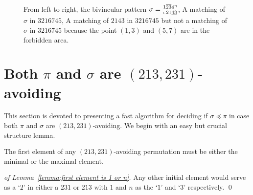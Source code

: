 \documentclass[a4paper]{llncs}
\newcommand\BV[2]{\genfrac{}{}{0pt}{}{#1}{#2}}
\begin{document}
\begin{figure}[t]
    	 
    	 
    	    	
    	\caption[Example pattern matching]{
    		From left to right,
    		the bivincular pattern $\sigma = \BV{1\overline{23}4\urcorner}{\llcorner 21\underline{43}  }$, A matching of $\sigma$ in $3216745$, A matching of $2143$ in $3216745$ but not a matching of $\sigma$ in $3216745$ because the point $(1,3)$ and $(5,7)$ are in the forbidden area.} 
    	\label{example:bivincular pattern matching}
\end{figure}


\section{Both $\pi$ and $\sigma$ are $(213,231)$-avoiding}
\label{section:both are (213,231)-avoiding}



This section is devoted to presenting a fast algorithm for deciding if
$\sigma \preceq \pi$
in case both $\pi$ and $\sigma$ are $(213,231)$-avoiding.
We begin with an easy but crucial structure lemma.

\begin{lemma}[Folklore]
\label{lemma:first element is 1 or n}
The first element of any $(213,231)$-avoiding permutation
must be either the minimal or the maximal element.
\end{lemma}

\begin{proof}[of Lemma~\ref{lemma:first element is 1 or n}]
Any other initial element would serve as a `$2$' in either a
$231$ or $213$ with $1$ and $n$ as the `$1$' and `$3$' respectively.
\qed
\end{proof}
\end{document}
